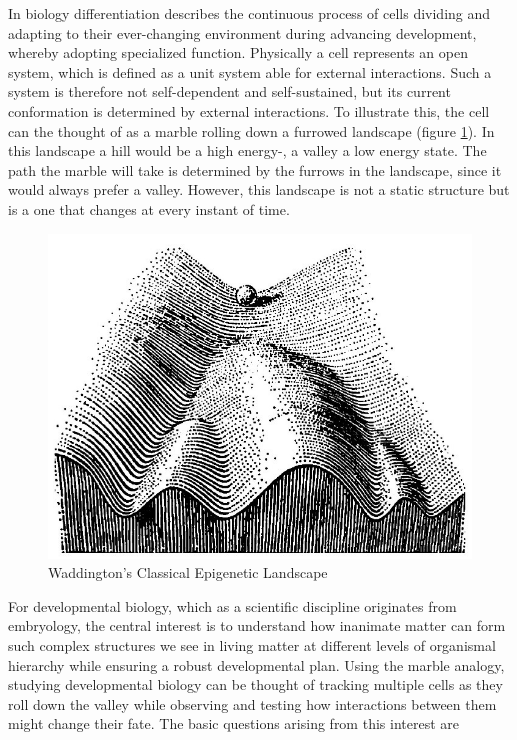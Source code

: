 \documentclass[11pt,singlespacinge,twoside]{reedthesis} %
\begin{document}
In biology differentiation describes the continuous process of cells dividing and adapting to their ever-changing environment during advancing development, whereby adopting specialized function. Physically a cell represents an open system, which is defined as a unit system able for external interactions. Such a system is therefore not self-dependent and self-sustained, but its current conformation is determined by external interactions. To illustrate this, the cell can the thought of as a marble rolling down a furrowed landscape (figure \ref{fig:wadd}). In this landscape a hill would be a high energy-, a valley a low energy state. The path the marble will take is determined by the furrows in the landscape, since it would always prefer a valley. However, this landscape is not a static structure but is a one that changes at every instant of time.
\begin{figure}

{\centering \includegraphics{figures/intro/waddington} 

}

\caption{Waddington's Classical Epigenetic Landscape}\label{fig:wadd}
\end{figure}
For developmental biology, which as a scientific discipline originates from embryology, the central interest is to understand how inanimate matter can form such complex structures we see in living matter at different levels of organismal hierarchy while ensuring a robust developmental plan. Using the marble analogy, studying developmental biology can be thought of tracking multiple cells as they roll down the valley while observing and testing how interactions between them might change their fate. The basic questions arising from this interest are
\end{document}
